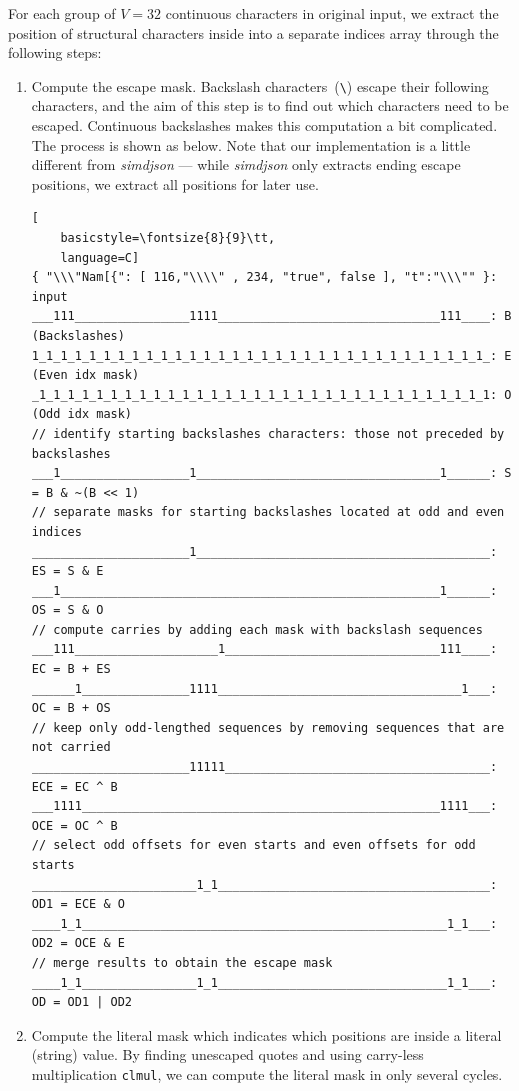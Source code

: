 \documentclass[11pt]{article}
\begin{document}
For each group of $V=32$ continuous characters in original input, we extract the position of structural characters inside into a separate indices array through the following steps:
\begin{enumerate}
    \item Compute the escape mask. Backslash characters~(\verb|\|) escape their following characters, and the aim of this step is to find out which characters need to be escaped. Continuous backslashes makes this computation a bit complicated. The process is shown as below. Note that our implementation is a little different from \textit{simdjson} --- while \textit{simdjson} only extracts ending escape positions, we extract all positions for later use.
\begin{lstlisting}[
    basicstyle=\fontsize{8}{9}\tt,
    language=C]
{ "\\\"Nam[{": [ 116,"\\\\" , 234, "true", false ], "t":"\\\"" }: input
___111________________1111_______________________________111____: B (Backslashes)
1_1_1_1_1_1_1_1_1_1_1_1_1_1_1_1_1_1_1_1_1_1_1_1_1_1_1_1_1_1_1_1_: E (Even idx mask)
_1_1_1_1_1_1_1_1_1_1_1_1_1_1_1_1_1_1_1_1_1_1_1_1_1_1_1_1_1_1_1_1: O (Odd idx mask)
// identify starting backslashes characters: those not preceded by backslashes
___1__________________1__________________________________1______: S = B & ~(B << 1)
// separate masks for starting backslashes located at odd and even indices
______________________1_________________________________________: ES = S & E
___1_____________________________________________________1______: OS = S & O
// compute carries by adding each mask with backslash sequences
___111____________________1______________________________111____: EC = B + ES
______1_______________1111__________________________________1___: OC = B + OS
// keep only odd-lengthed sequences by removing sequences that are not carried
______________________11111_____________________________________: ECE = EC ^ B
___1111__________________________________________________1111___: OCE = OC ^ B
// select odd offsets for even starts and even offsets for odd starts
_______________________1_1______________________________________: OD1 = ECE & O
____1_1___________________________________________________1_1___: OD2 = OCE & E
// merge results to obtain the escape mask
____1_1________________1_1________________________________1_1___: OD = OD1 | OD2
\end{lstlisting}
    \item Compute the literal mask which indicates which positions are inside a literal (string) value. By finding unescaped quotes and using carry-less multiplication \texttt{clmul}, we can compute the literal mask in only several cycles.

\end{enumerate}
\end{document}
